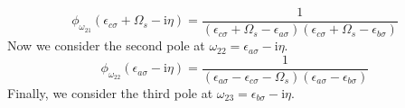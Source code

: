\documentclass[12pt]{caltech_thesis}
\begin{document}
\begin{equation}
\phi_{\omega_{21}}(\epsilon_{c \sigma} + \Omega_s - \mathrm{i} \eta) = \frac{1}{(\epsilon_{c \sigma} + \Omega_s -\epsilon_{a \sigma})(\epsilon_{c \sigma} + \Omega_s -\epsilon_{b \sigma})}
\end{equation}
Now we consider the second pole at $\omega_{22} = \epsilon _{a\sigma } - \mathrm{i} \eta$.
\begin{equation}
\phi_{\omega_{22}}(\epsilon_{a \sigma} - \mathrm{i} \eta) = \frac{1}{(\epsilon_{a \sigma} -\epsilon_{c \sigma}-\Omega_s)(\epsilon_{a \sigma} -\epsilon_{b \sigma})}
\end{equation}
Finally, we consider the third pole at $\omega_{23} = \epsilon _{b\sigma } - \mathrm{i} \eta$.
\end{document}
